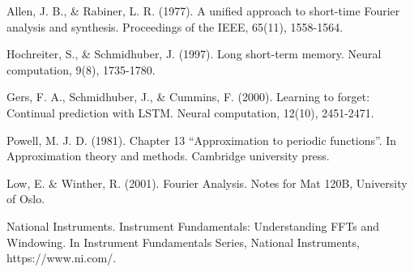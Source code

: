 \documentclass[a4paper, oneside, 13pt]{book}
\begin{document}
\begin{thebibliography}{80}
	Allen, J. B., \& Rabiner, L. R. (1977). A unified approach to short-time Fourier analysis and synthesis. Proceedings of the IEEE, 65(11), 1558-1564.
	
	
	Hochreiter, S., \& Schmidhuber, J. (1997). Long short-term memory. Neural computation, 9(8), 1735-1780.
	
	Gers, F. A., Schmidhuber, J., \& Cummins, F. (2000). Learning to forget: Continual prediction with LSTM. Neural computation, 12(10), 2451-2471.
	
	
	
	Powell, M. J. D. (1981). Chapter 13 ``Approximation to periodic functions''. In Approximation theory and methods. Cambridge university press.
	
	Low, E. \& Winther, R. (2001). Fourier Analysis. Notes for Mat 120B, University of Oslo.
	
	
	
	National Instruments. Instrument Fundamentals: Understanding FFTs and Windowing. In Instrument Fundamentals Series, National Instruments, https://www.ni.com/.
	
	
\end{thebibliography}


%
%

\setlength{\parskip}{2.5mm}

%


\setlength{\parskip}{0mm}
\end{document}
